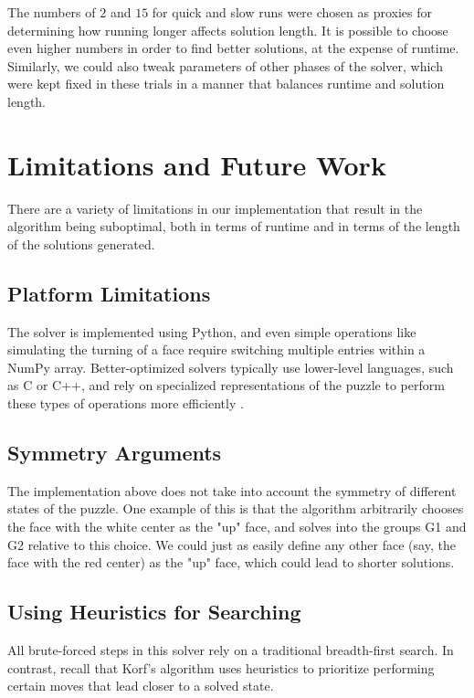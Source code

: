 \documentclass{article}
\begin{document}
The numbers of $2$ and $15$ for quick and slow runs were chosen as proxies for determining how running longer affects solution length. It is possible to choose even higher numbers in order to find better solutions, at the expense of runtime. Similarly, we could also tweak parameters of other phases of the solver, which were kept fixed in these trials in a manner that balances runtime and solution length.


\section{Limitations and Future Work}

There are a variety of limitations in our implementation that result in the algorithm being suboptimal, both in terms of runtime and in terms of the length of the solutions generated. %

\subsection{Platform Limitations}
The solver is implemented using Python, and even simple operations like simulating the turning of a face require switching multiple entries within a NumPy array. Better-optimized solvers typically use lower-level languages, such as C or C++, and rely on specialized representations of the puzzle to perform these types of operations more efficiently \cite{kociemba-coord}.

\subsection{Symmetry Arguments}
The implementation above does not take into account the symmetry of different states of the puzzle. One example of this is that the algorithm arbitrarily chooses the face with the white center as the "up" face, and solves into the groups G1 and G2 relative to this choice. We could just as easily define any other face (say, the face with the red center) as the "up" face, which could lead to shorter solutions.

\subsection{Using Heuristics for Searching}
All brute-forced steps in this solver rely on a traditional breadth-first search. In contrast, recall that Korf's algorithm uses heuristics to prioritize performing certain moves that lead closer to a solved state.
\end{document}
